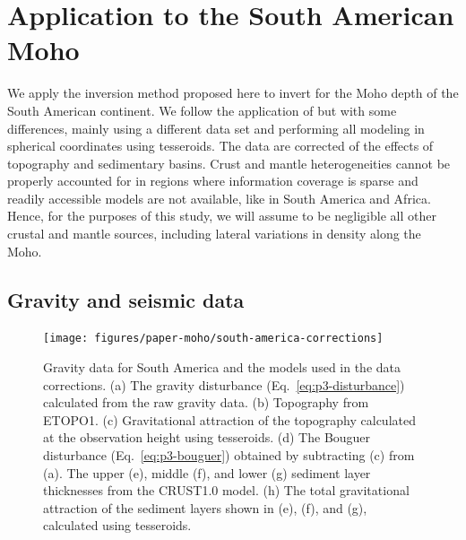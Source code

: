 \section{Application to the South American Moho}


We apply the inversion method proposed here to invert for the Moho depth of the
South American continent.
We follow the application of \citet{vandermeijde2013} but with some
differences, mainly using a different data set and performing all modeling
in spherical coordinates using tesseroids.
The data are corrected of the effects of topography and sedimentary basins.
Crust and mantle heterogeneities cannot be properly accounted for
in regions where information coverage is sparse and readily accessible models
are not available, like in South America and Africa.
Hence, for the purposes of this study, we will assume to be negligible all
other crustal and mantle sources, including lateral variations in density along
the Moho.


\subsection{Gravity and seismic data}

\begin{figure}
    \centering
    \texttt{[image: figures/paper-moho/south-america-corrections]}
    \caption{
        Gravity data for South America and the models used in the data
        corrections.
        (a) The gravity disturbance (Eq.~\ref{eq:p3-disturbance}) calculated from
        the raw gravity data.
        (b) Topography from ETOPO1.
        (c) Gravitational attraction of the topography calculated
        at the observation height using tesseroids.
        (d) The Bouguer disturbance (Eq.~\ref{eq:p3-bouguer}) obtained by
        subtracting (c) from (a).
        The upper (e), middle (f), and lower (g) sediment layer thicknesses
        from the CRUST1.0 model.
        (h) The total gravitational attraction of the sediment layers shown in
        (e), (f), and (g), calculated using tesseroids.
        }
    \label{fig:p3-sam-corrections}
\end{figure}


